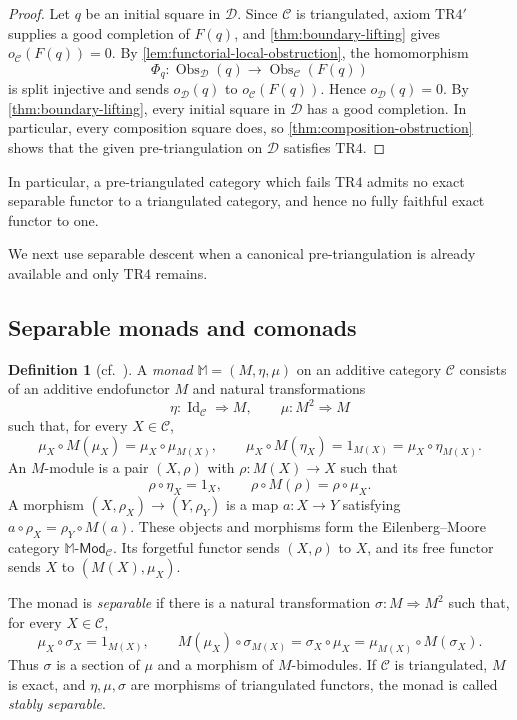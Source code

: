 \documentclass[a4paper,11pt,reqno]{amsart}
\theoremstyle{definition}
\newtheorem{definition}[definition]{Definition}
\theoremstyle{plain}
\numberwithin{equation}{section}
\newcommand{\C}{\mathcal C}
\newcommand{\D}{\mathcal D}
\begin{document}
\begin{proof}
Let \(q\) be an initial square in \(\D\).  Since \(\C\) is triangulated,
axiom \(\mathrm{TR4}'\) supplies a good completion of \(F(q)\), and
\cref{thm:boundary-lifting} gives \(o_\C(F(q))=0\).  By
\cref{lem:functorial-local-obstruction}, the
homomorphism
\[
 \Phi_q:\operatorname{Obs}_\D(q)\longrightarrow
 \operatorname{Obs}_\C(F(q))
\]
is split injective and sends \(o_\D(q)\) to \(o_\C(F(q))\).  Hence
\(o_\D(q)=0\).  By \cref{thm:boundary-lifting}, every initial square in
\(\D\) has a good completion.  In particular, every composition square
does, so \cref{thm:composition-obstruction} shows that the given
pre-triangulation on \(\D\) satisfies \(\mathrm{TR4}\).
\end{proof}


In particular, a pre-triangulated category which fails \(\mathrm{TR4}\)
admits no exact separable functor to a triangulated category, and hence no
fully faithful exact functor to one.

We next use separable descent when a canonical pre-triangulation is already
available and only $\mathrm{TR4}$ remains.

\subsection{Separable monads and comonads}

\begin{definition}[{\normalfont cf.~\cite[Definitions~2.1, 2.4, and~3.5]
{Balmer2011}}]
A \emph{monad} \(\mathbb M=(M,\eta,\mu)\) on an additive category
\(\C\) consists of an additive endofunctor \(M\) and natural
transformations
\[
 \eta:\operatorname{Id}_\C\Rightarrow M,
 \qquad
 \mu:M^2\Rightarrow M
\]
such that, for every \(X\in\C\),
\[
 \mu_X\circ M(\mu_X)=\mu_X\circ\mu_{M(X)},\qquad
 \mu_X\circ M(\eta_X)=1_{M(X)}
 =\mu_X\circ\eta_{M(X)}.
\]
An \(M\)-module is a pair \((X,\rho)\) with \(\rho:M(X)\to X\) such that
\[
 \rho\circ\eta_X=1_X,
 \qquad
 \rho\circ M(\rho)=\rho\circ\mu_X.
\]
A morphism \((X,\rho_X)\to(Y,\rho_Y)\) is a map \(a:X\to Y\) satisfying
\(a\circ\rho_X=\rho_Y\circ M(a)\).  These objects and morphisms form the
Eilenberg--Moore category \(\mathbb M\text{-}\mathsf{Mod}_\C\).  Its
forgetful functor sends \((X,\rho)\) to \(X\), and its free functor sends
\(X\) to \((M(X),\mu_X)\).

The monad is \emph{separable} if there is a natural transformation
\(\sigma:M\Rightarrow M^2\) such that, for every \(X\in\C\),
\begin{equation}
\label{eq:separable-monad-identities}
 \mu_X\circ\sigma_X=1_{M(X)},\qquad
 M(\mu_X)\circ\sigma_{M(X)}
 =\sigma_X\circ\mu_X
 =\mu_{M(X)}\circ M(\sigma_X).
\end{equation}
Thus \(\sigma\) is a section of \(\mu\) and a morphism of
\(M\)-bimodules.  If \(\C\) is triangulated, \(M\) is exact, and
\(\eta,\mu,\sigma\) are morphisms of triangulated functors, the monad is
called \emph{stably separable}.
\end{definition}
\end{document}
